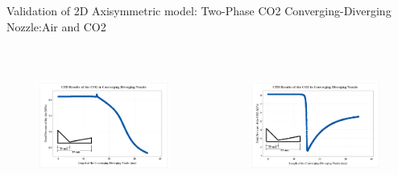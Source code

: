 \begin{frame}{Validation of 2D Axisymmetric model: Two-Phase CO2 Converging-Diverging Nozzle:Air and CO2}
 \begin{columns}
    \begin{figure}
        \centering
        \includegraphics[height=4.5cm]{images/cdnco2totalpress.png}
    \end{figure}
  \begin{figure}
        \centering
        \includegraphics[height=4.5cm]{images/cdnco2press1.png}
    \end{figure}
 \end{columns}
\end{frame}

